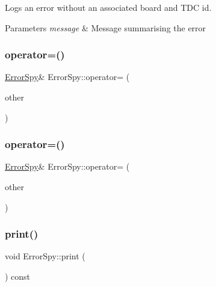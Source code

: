 Logs an error without an associated board and T\+DC id. 


\begin{DoxyParams}{Parameters}
{\em message} & Message summarising the error \\
\hline
\end{DoxyParams}
\mbox{\label{class_error_spy_a1ee5e050efa950d40f48245550cb5aad}} 
\subsubsection{\texorpdfstring{operator=()}{operator=()}\hspace{0.1cm}{\footnotesize\ttfamily [1/2]}}
{\footnotesize\ttfamily \hyperlink{class_error_spy}{Error\+Spy}\& Error\+Spy\+::operator= (\begin{DoxyParamCaption}\item[{\hyperlink{class_error_spy}{Error\+Spy}}]{other }\end{DoxyParamCaption})\hspace{0.3cm}{\ttfamily [delete]}}

\mbox{\label{class_error_spy_a1a48d70388ccb40d03357ce9f93158c9}} 
\subsubsection{\texorpdfstring{operator=()}{operator=()}\hspace{0.1cm}{\footnotesize\ttfamily [2/2]}}
{\footnotesize\ttfamily \hyperlink{class_error_spy}{Error\+Spy}\& Error\+Spy\+::operator= (\begin{DoxyParamCaption}\item[{\hyperlink{class_error_spy}{Error\+Spy} \&\&}]{other }\end{DoxyParamCaption})\hspace{0.3cm}{\ttfamily [delete]}}

\mbox{\label{class_error_spy_a85e971684266e774c896ee681850614a}} 
\subsubsection{\texorpdfstring{print()}{print()}}
{\footnotesize\ttfamily void Error\+Spy\+::print (\begin{DoxyParamCaption}{ }\end{DoxyParamCaption}) const}



